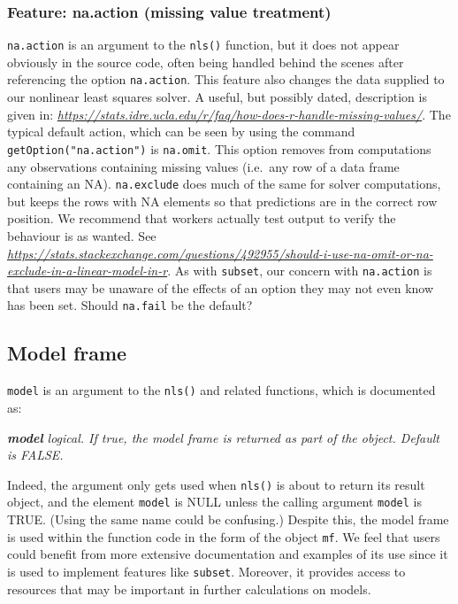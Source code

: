 \documentclass[
]{article}
\begin{document}
\hypertarget{feature-na.action-missing-value-treatment}{%
\subsubsection{Feature: na.action (missing value
treatment)}\label{feature-na.action-missing-value-treatment}}

\texttt{na.action} is an argument to the \texttt{nls()} function, but it
does not appear obviously in the source code, often being handled behind
the scenes after referencing the option \texttt{na.action}. This feature
also changes the data supplied to our nonlinear least squares solver. A
useful, but possibly dated, description is given in:
\emph{\url{https://stats.idre.ucla.edu/r/faq/how-does-r-handle-missing-values/}}.
The typical default action, which can be seen by using the command
\texttt{getOption("na.action")} is \texttt{na.omit}. This option removes
from computations any observations containing missing values (i.e.~any
row of a data frame containing an NA). \texttt{na.exclude} does much of
the same for solver computations, but keeps the rows with NA elements so
that predictions are in the correct row position. We recommend that
workers actually test output to verify the behaviour is as wanted. See
\emph{\url{https://stats.stackexchange.com/questions/492955/should-i-use-na-omit-or-na-exclude-in-a-linear-model-in-r}}.
As with \texttt{subset}, our concern with \texttt{na.action} is that
users may be unaware of the effects of an option they may not even know
has been set. Should \texttt{na.fail} be the default?

\hypertarget{model-frame}{%
\subsection{Model frame}\label{model-frame}}

\texttt{model} is an argument to the \texttt{nls()} and related
functions, which is documented as:

\emph{\textbf{model} logical. If true, the model frame is returned as
part of the object. Default is FALSE.}

Indeed, the argument only gets used when \texttt{nls()} is about to
return its result object, and the element \texttt{model} is NULL unless
the calling argument \texttt{model} is TRUE. (Using the same name could
be confusing.) Despite this, the model frame is used within the function
code in the form of the object \texttt{mf}. We feel that users could
benefit from more extensive documentation and examples of its use since
it is used to implement features like \texttt{subset}. Moreover, it
provides access to resources that may be important in further
calculations on models.
\end{document}
